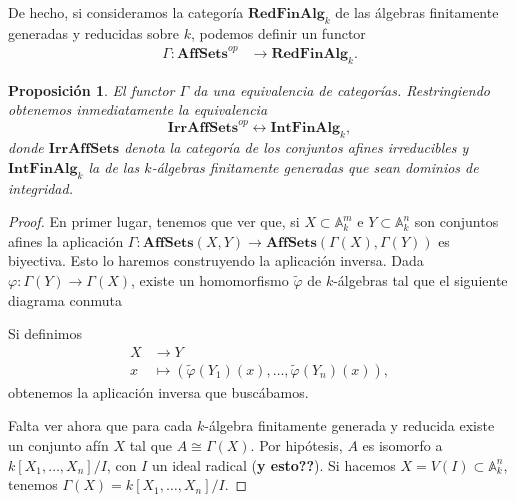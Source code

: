 \documentclass[12pt,a4paper]{article}
\newtheorem{prop}[thm]{Proposición}
\theoremstyle{definition} \newtheorem{defn}[thm]{Definición}
\theoremstyle{definition} \newtheorem{ejemplo}[thm]{Ejemplo}
\theoremstyle{definition} \newtheorem{ejercicio}[thm]{Ejercicio}
\theoremstyle{remark} \newtheorem*{obs}{Observación}
\def\AA{\mathbb{A}}
\begin{document}
    De hecho, si consideramos la categoría $\mathbf{RedFinAlg}_k$ de las álgebras finitamente generadas y reducidas sobre $k$, podemos definir un functor
    \begin{align*}
      \Gamma : \mathbf{AffSets}^{op}&\longrightarrow \mathbf{RedFinAlg}_k.
      \end{align*}

      \begin{prop}
	El functor $\Gamma$ da una equivalencia de categorías. Restringiendo obtenemos inmediatamente la equivalencia
	\begin{equation*}
	  \mathbf{IrrAffSets}^{op} \longleftrightarrow \mathbf{IntFinAlg}_k,
	\end{equation*}
	donde $\mathbf{IrrAffSets}$ denota la categoría de los conjuntos afines irreducibles y $\mathbf{IntFinAlg}_k$ la de las $k$-álgebras finitamente generadas que sean dominios de integridad.
      \end{prop}

      \begin{proof}
	En primer lugar, tenemos que ver que, si $X\subset \AA^m_k$ e $Y\subset \AA^n_k$ son conjuntos afines la aplicación $\Gamma: \mathbf{AffSets}(X,Y) \rightarrow \mathbf{AffSets}(\Gamma(X),\Gamma(Y))$ es biyectiva. Esto lo haremos construyendo la aplicación inversa. Dada $\varphi:\Gamma(Y) \rightarrow \Gamma(X)$, existe un homomorfismo $\tilde \varphi$ de $k$-álgebras tal que el siguiente diagrama conmuta
	\begin{center}
	 \end{center}
	 Si definimos 
	 \begin{align*}
	   X&\longrightarrow Y\\ 
	     x &\longmapsto (\tilde\varphi(Y_1)(x),\dots,\tilde\varphi(Y_n)(x)),
	   \end{align*}
	   obtenemos la aplicación inversa que buscábamos.

	   Falta ver ahora que para cada $k$-álgebra finitamente generada y reducida existe un conjunto afín $X$ tal que $A\cong \Gamma(X)$. Por hipótesis, $A$ es isomorfo a $k[X_1,\dots,X_n]/I$, con $I$ un ideal radical (\textbf{y esto??}). Si hacemos $X=V(I)\subset \AA^n_k$, tenemos $\Gamma(X)=k[X_1,\dots,X_n]/I$.
      \end{proof}
\end{document}
